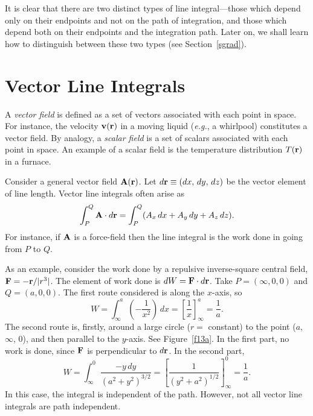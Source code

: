 It is clear that there are two distinct types of line integral---those which depend only on their
endpoints and not on the path of integration, and those which depend  both on their endpoints
and the integration path. Later on, we shall learn how to distinguish between these two types (see Section~\ref{sgrad}).

\section{Vector Line Integrals}\label{sveclinei}
A {\em vector field}\/ is defined as a set of vectors associated with each point in space.
For instance, the velocity ${\bf v}({\bf r})$ in a moving liquid 
({\em e.g.}, a whirlpool) constitutes
a vector field. By analogy, a {\em scalar field}\/ is a set of scalars associated with each
point in space. An example of a scalar field is the temperature distribution $T({\bf r})$ in
a furnace. 

Consider a general vector field ${\bf A}({\bf r})$. Let $d{\bf r} \equiv (dx,\,dy,\,dz)$ be the
vector element of line length. Vector line integrals often arise as 
\begin{equation}
\int_P^Q {\bf A}\cdot d{\bf r} = \int_P^Q (A_x\,dx+A_y\,dy + A_z\,dz).
\end{equation}
For instance, if ${\bf A}$ is a force-field then the line integral is the work done in going from
$P$ to $Q$. 

As an example, consider the work done by a repulsive inverse-square 
central field, ${\bf F} = - {\bf r}/ |r^3|$. The 
element of work done  is $dW={\bf F}\cdot d{\bf r}$. 
Take $P=(\infty, 0, 0)$ and $Q=(a,0,0)$. The first route considered is along the $x$-axis, so 
\begin{equation}
W = \int_{\infty}^a \left(-\frac{1}{x^2}\right)\,dx = \left[\frac{1}{x}\right]_{\infty}^a
=\frac{1}{a}.
\end{equation}
The second route is, firstly, around a large circle ($r=$ constant) to the point
($a$, $\infty$, 0), and then parallel to the $y$-axis. See Figure~\ref{f13a}. In the first  part, no work is 
done,
since ${\bf F}$ is perpendicular to $d{\bf r}$. In the second part,
\begin{equation}
W = \int_{\infty}^0 \frac{-y\,dy}{(a^2 + y^2)^{3/2}} = \left[\frac{1}{(y^2+a^2)^{1/2}}
\right]^0_\infty = \frac{1}{a}.
\end{equation}
In this case, the integral is independent of the path. However, not all vector line integrals
are path independent.

